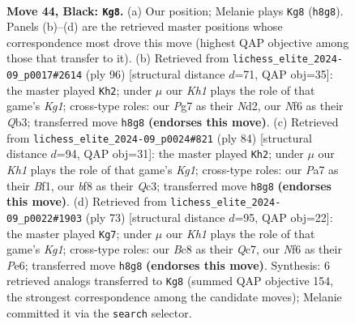 \documentclass[11pt]{article}
\begin{document}
\begin{figure}[p]
\label{fig:thought-m85}
\end{figure}

\clearpage

\begin{figure}[p]\centering
\begin{subfigure}{0.46\textwidth}\centering
\resizebox{\linewidth}{!}{%
\newchessgame
\chessboard[
  setfen={r1b2B1k/p1p2pp1/1p3n2/1q5p/5P1b/1P2Q2P/P1B3PK/R7 b - - 1 44},
  showmover=false,
  pgfstyle=straightmove, color=movearrow, markmove={h8-g8}
]}
\caption{}
\end{subfigure}\hfill
\begin{subfigure}{0.46\textwidth}\centering
\resizebox{\linewidth}{!}{%
\newchessgame
\chessboard[
  setfen={3rbb2/2q3pk/5p1p/p3p3/P1P5/1QB1P2P/R2N1PP1/6K1 w - - 25 49},
  showmover=false,
  pgfstyle=straightmove, color=movearrow, markmove={g1-h2}
]}
\caption{}
\end{subfigure}
\\[4pt]
\begin{subfigure}{0.46\textwidth}\centering
\resizebox{\linewidth}{!}{%
\newchessgame
\chessboard[
  setfen={8/p3qp1k/Pnb3p1/2p3r1/5N1p/2Q1P2P/5PP1/2R2BK1 w - - 21 43},
  showmover=false,
  pgfstyle=straightmove, color=movearrow, markmove={g1-h2}
]}
\caption{}
\end{subfigure}\hfill
\begin{subfigure}{0.46\textwidth}\centering
\resizebox{\linewidth}{!}{%
\newchessgame
\chessboard[
  setfen={6k1/2q2p2/4p1p1/p1p2n1p/B1Pb4/5Q1P/1r3PP1/5RK1 b - - 4 37},
  showmover=false,
  pgfstyle=straightmove, color=movearrow, markmove={g8-g7}
]}
\caption{}
\end{subfigure}
\caption{\textbf{Move 44, Black: \texttt{Kg8}.} (a) Our position; Melanie plays \texttt{Kg8} (\texttt{h8g8}). Panels (b)--(d) are the retrieved master positions whose correspondence most drove this move (highest QAP objective among those that transfer to it). (b) Retrieved from \texttt{lichess\_elite\_2024-09\_p0017\#2614} (ply 96) [structural distance $d$=71, QAP obj=35]: the master played \texttt{Kh2}; under $\mu$ our \emph{Kh1} plays the role of that game's \emph{Kg1}; cross-type roles: our \emph{P}g7 as their \emph{N}d2, our \emph{N}f6 as their \emph{Q}b3; transferred move \texttt{h8g8} \textbf{(endorses this move)}. (c) Retrieved from \texttt{lichess\_elite\_2024-09\_p0024\#821} (ply 84) [structural distance $d$=94, QAP obj=31]: the master played \texttt{Kh2}; under $\mu$ our \emph{Kh1} plays the role of that game's \emph{Kg1}; cross-type roles: our \emph{P}a7 as their \emph{B}f1, our \emph{b}f8 as their \emph{Q}c3; transferred move \texttt{h8g8} \textbf{(endorses this move)}. (d) Retrieved from \texttt{lichess\_elite\_2024-09\_p0022\#1903} (ply 73) [structural distance $d$=95, QAP obj=22]: the master played \texttt{Kg7}; under $\mu$ our \emph{Kh1} plays the role of that game's \emph{Kg1}; cross-type roles: our \emph{B}c8 as their \emph{Q}c7, our \emph{N}f6 as their \emph{P}e6; transferred move \texttt{h8g8} \textbf{(endorses this move)}. Synthesis: 6 retrieved analogs transferred to \texttt{Kg8} (summed QAP objective 154, the strongest correspondence among the candidate moves); Melanie committed it via the \texttt{search} selector.}

\end{figure}
\end{document}

